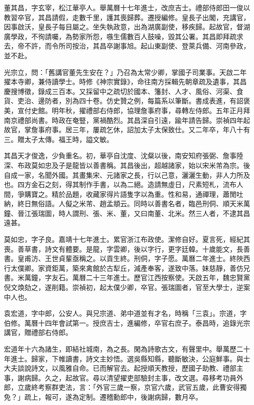 \begin{pinyinscope}
董其昌，字玄宰，松江華亭人。舉萬曆十七年進士，改庶吉士。禮部侍郎田一俊以教習卒官，其昌請假，走數千里，護其喪歸葬。遷授編修。皇長子出閣，充講官，因事啟沃，皇長子每目屬之。坐失執政意，出為湖廣副使，移疾歸。起故官，督湖廣學政，不徇請囑，為勢家所怨，嗾生儒數百人鼓噪，毀其公署。其昌即拜疏求去，帝不許，而令所司按治，其昌卒謝事旭。起山東副使、登萊兵備、河南參政，並不赴。

光宗立，問：「舊講官董先生安在？」乃召為太常少卿，掌國子司業事。天啟二年擢本寺卿，兼侍讀學士。時修《神宗實錄》，命往南方採輯先朝章疏及遺事，其昌慶搜博徵，錄成三百本。又採留中之疏切於國本、籓封、人才、風俗、河渠、食貨、吏治、邊防者，別為四十卷。仿史贊之例，每篇系以筆斷。書成表進，有詔褒美，宣付史館。明年秋，擢禮部右侍郎，協理詹事府事，尋轉左侍郎。五年正月拜南京禮部尚書。時政在奄豎，黨禍酷烈。其昌深自引遠，踰年請告歸。崇禎四年起故官，掌詹事府事。居三年，屢疏乞休，詔加太子太保致仕。又二年卒，年八十有三。贈太子太傳。福王時，謚文敏。

其昌天才俊逸，少負重名。初，華亭自沈度、沈粲以後，南安知府張弼、詹事陸深、布政莫如忠及子是龍皆以善書稱。其昌後出，超越諸家，始以宋米芾為宗。後自成一家，名聞外國。其畫集宋、元諸家之長，行以己意，灑灑生動，非人力所及也。四方金石之刻，得其制作手書，以為二絕。造請無虛日，尺素短札，流布人間，爭購寶之。精於品題，收藏家得片語隻字以為重。性和易，通禪理，蕭閒吐納，終日無俗語。人儗之米芾、趙孟頫云。同時以善書名者，臨邑刑侗、順天米萬鐘、晉江張瑞圖，時人謂刑、張、米、董，又曰南董、北米。然三人者，不逮其昌遠甚。

莫如忠，字子良。嘉靖十七年進士。累官浙江布政使。潔修自好。夏言死，經紀其喪。善草書，詩文有體要。是龍，字雲卿，後以字行，更字廷韓。十歲能文，長善書。皇甫汸、王世貞輩亟稱之。以貢生終。刑侗，字子愿。萬曆二年進士。終陜西行太僕卿。家資鉅萬，築來禽館於古犁丘，減產奉客，遂致中落。妹慈靜，善仿兄書。米萬鐘，字友石。萬曆二十三年進士。歷官江西按察使。天啟五年，魏忠賢黨倪文煥劾之，遂削籍。崇禎初，起太僕少卿，卒官。張瑞圖者，官至大學士，逆案中人也。

袁宏道，字中郎，公安人。與兄宗道、弟中道並有才名，時稱「三袁」。宗道，字伯修。萬曆十四年會試第一。授庶吉士，進編修，卒官右庶子。泰昌時，追錄光宗講官，贈禮部右侍郎。

宏道年十六為諸生，即結社城南，為之長。閑為詩歌古文，有聲里中。舉萬歷二十年進士。歸家，下帷讀書，詩文主妙悟。選吳縣知縣，聽斷敏決，公庭鮮事。與士大夫談說詩文，以風雅自命。已而解官去。起授順天教授，歷國子助教、禮部主事，謝病歸。久之，起故官。尋以清望擢吏部驗封主事，改文選。尋移考功員外郎，立歲終考察群吏法，言：「外官三歲一察，京官六歲，武官五歲，此曹安得獨免？」疏上，報可，遂為定制。遷稽勳郎中，後謝病歸，數月卒。


\end{pinyinscope}
